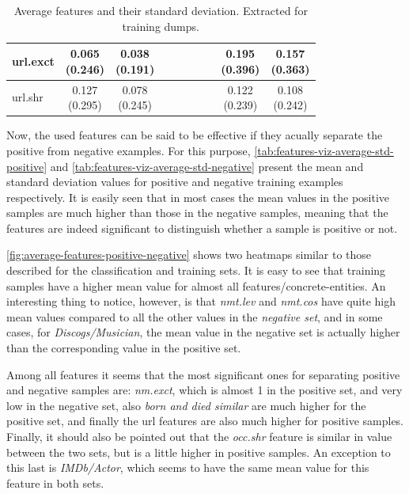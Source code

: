 \documentclass[epsfig,a4paper,11pt,titlepage,twoside,openany]{book}
\begin{document}
\begin{table}[H]
\begin{tabular}{l|c|c|c|c|c|c|c|c|c|}
\multicolumn{1}{|l|}{url.exct}                           & \makecell{0.065 \\ (0.246)}  & \makecell{0.038 \\ (0.191)} &              &              &              &              &              & \makecell{0.195 \\ (0.396)}    & \makecell{0.157 \\ (0.363)}   \\ \hline
\multicolumn{1}{|l|}{url.shr}                  & \makecell{0.127 \\ (0.295)}  & \makecell{0.078 \\ (0.245)} &              &              &              &              &              & \makecell{0.122 \\ (0.239)}    & \makecell{0.108 \\ (0.242)}   \\ \hline
\end{tabular}
\caption{Average features and their standard deviation. Extracted for training dumps.}
\label{tab:features-viz-average-std-training}
\end{table}


Now, the used features can be said to be effective if they acually separate the positive from negative examples. For this purpose, \autoref{tab:features-viz-average-std-positive} and \autoref{tab:features-viz-average-std-negative} present the mean and standard deviation values for positive and negative training examples respectively. It is easily seen that in most cases the mean values in the positive samples are much higher than those in the negative samples, meaning that the features are indeed significant to distinguish whether a sample is positive or not.
 
\autoref{fig:average-features-positive-negative} shows two heatmaps similar to those described for the classification and training sets. It is easy to see that training samples have a higher mean value for almost all features/concrete-entities. An interesting thing to notice, however, is that \textit{nmt.lev} and \textit{nmt.cos} have quite high mean values compared to all the other values in the \textit{negative set}, and in some cases, for \textit{Discogs/Musician}, the mean value in the negative set is actually higher than the corresponding value in the positive set. 

Among all features it seems that the most significant ones for separating positive and negative samples are: \textit{nm.exct}, which is almost 1 in the positive set, and very low in the negative set, also \textit{born and died similar} are much higher for the positive set, and finally the url features are also much higher for positive samples. Finally, it should also be pointed out that the \textit{occ.shr} feature is similar in value between the two sets, but is a little higher in positive samples. An exception to this last is \textit{IMDb/Actor}, which seems to have the same mean value for this feature in both sets.
\end{document}
